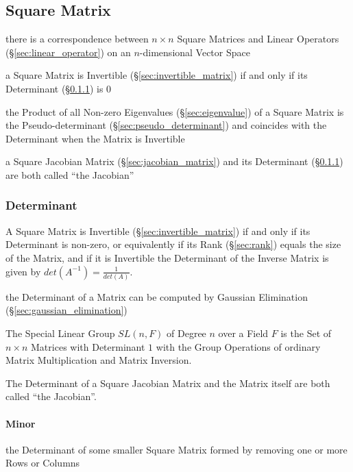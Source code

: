 \subsection{Square Matrix}\label{sec:square_matrix}

there is a correspondence between $n\times{n}$ Square Matrices and Linear
Operators (\S\ref{sec:linear_operator}) on an $n$-dimensional Vector Space

a Square Matrix is Invertible (\S\ref{sec:invertible_matrix}) if and only if
its Determinant (\S\ref{sec:determinant}) is $0$

the Product of all Non-zero Eigenvalues (\S\ref{sec:eigenvalue}) of a Square
Matrix is the Pseudo-determinant (\S\ref{sec:pseudo_determinant}) and coincides
with the Determinant when the Matrix is Invertible

a Square Jacobian Matrix (\S\ref{sec:jacobian_matrix}) and its Determinant
(\S\ref{sec:determinant}) are both called ``the Jacobian''



\subsubsection{Determinant}\label{sec:determinant}

A Square Matrix is Invertible (\S\ref{sec:invertible_matrix}) if and only if
its Determinant is non-zero, or equivalently if its Rank (\S\ref{sec:rank})
equals the size of the Matrix, and if it is Invertible the Determinant of the
Inverse Matrix is given by $det(A^{-1}) = \frac{1}{det(A)}$.

\fist the Determinant of a Matrix can be computed by Gaussian Elimination
(\S\ref{sec:gaussian_elimination})

The Special Linear Group $SL(n,F)$ of Degree $n$ over a Field $F$ is the Set of
$n \times n$ Matrices with Determinant $1$ with the Group Operations of
ordinary Matrix Multiplication and Matrix Inversion.

The Determinant of a Square Jacobian Matrix and the Matrix itself are both
called ``the Jacobian''.



\paragraph{Minor}\label{sec:minor}\hfill

the Determinant of some smaller Square Matrix formed by removing one or more
Rows or Columns

